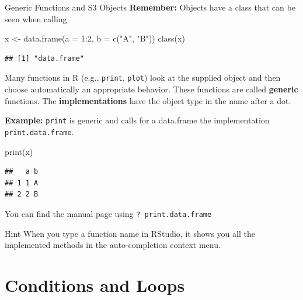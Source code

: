 \documentclass[
  9pt,
  ignorenonframetext,
]{beamer}
\newenvironment{Shaded}{\begin{snugshade}}{\end{snugshade}}
\newcommand{\DataTypeTok}[1]{\textcolor[rgb]{0.87,0.87,0.75}{#1}}
\newcommand{\DecValTok}[1]{\textcolor[rgb]{0.86,0.86,0.80}{#1}}
\newcommand{\KeywordTok}[1]{\textcolor[rgb]{0.94,0.87,0.69}{#1}}
\newcommand{\NormalTok}[1]{\textcolor[rgb]{0.80,0.80,0.80}{#1}}
\newcommand{\OperatorTok}[1]{\textcolor[rgb]{0.94,0.94,0.82}{#1}}
\newcommand{\StringTok}[1]{\textcolor[rgb]{0.80,0.58,0.58}{#1}}
\begin{document}
\begin{frame}[fragile]{Generic Functions and S3 Objects}
\protect\hypertarget{generic-functions-and-s3-objects}{}
\textbf{Remember:} Objects have a class that can be seen when calling

\begin{Shaded}
\begin{Highlighting}[]
\NormalTok{x \textless{}{-}}\StringTok{ }\KeywordTok{data.frame}\NormalTok{(}\DataTypeTok{a =} \DecValTok{1}\OperatorTok{:}\DecValTok{2}\NormalTok{, }\DataTypeTok{b =} \KeywordTok{c}\NormalTok{(}\StringTok{"A"}\NormalTok{, }\StringTok{"B"}\NormalTok{))}
\KeywordTok{class}\NormalTok{(x)}
\end{Highlighting}
\end{Shaded}

\begin{verbatim}
## [1] "data.frame"
\end{verbatim}

\vfill

Many functions in R (e.g., \texttt{print}, \texttt{plot}) look at the
supplied object and then choose automatically an appropriate behavior.
These functions are called \textbf{generic} functions. The
\textbf{implementations} have the object type in the name after a dot.

\vfill

\textbf{Example:} \texttt{print} is generic and calls for a data.frame
the implementation \texttt{print.data.frame}.

\begin{Shaded}
\begin{Highlighting}[]
\KeywordTok{print}\NormalTok{(x)}
\end{Highlighting}
\end{Shaded}

\begin{verbatim}
##   a b
## 1 1 A
## 2 2 B
\end{verbatim}

You can find the manual page using \texttt{?\ print.data.frame}

\vfill

\begin{block}{Hint}
\protect\hypertarget{hint}{}
When you type a function name in RStudio, it shows you all the
implemented methods in the auto-completion context menu.
\end{block}
\end{frame}

\hypertarget{conditions-and-loops}{%
\section{Conditions and Loops}\label{conditions-and-loops}}
\end{document}
